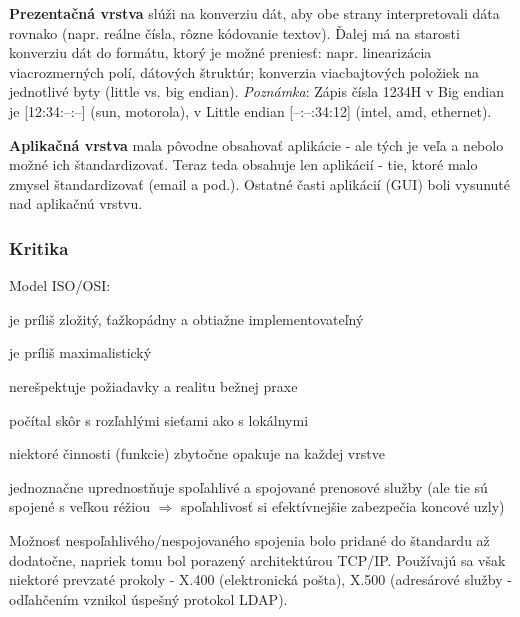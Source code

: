 \textbf{Prezentačná vrstva} slúži na konverziu dát, aby obe strany interpretovali dáta rovnako (napr. reálne čísla, rôzne kódovanie textov). Ďalej má na starosti konverziu dát do formátu, ktorý je možné preniesť: napr. linearizácia viacrozmerných polí, dátových štruktúr; konverzia viacbajtových položiek na jednotlivé byty (little vs. big endian). \emph{Poznámka}: Zápis čísla 1234H v Big endian je [12:34:--:--] (sun, motorola), v Little endian [--:--:34:12] (intel, amd, ethernet).

\textbf{Aplikačná vrstva} mala pôvodne obsahovať aplikácie - ale tých je veľa a nebolo možné ich štandardizovať. Teraz teda obsahuje len  aplikácií - tie, ktoré malo zmysel štandardizovať (email a pod.). Ostatné časti aplikácií (GUI) boli vysunuté nad aplikačnú vrstvu.

\subsubsection*{Kritika}
Model ISO/OSI:
\begin{pitemize}
	\item je príliš zložitý, ťažkopádny a obtiažne implementovateľný
	\item je príliš maximalistický
	\item nerešpektuje požiadavky a realitu bežnej praxe
	\item počítal skôr s rozľahlými sieťami ako s lokálnymi
	\item niektoré činnosti (funkcie) zbytočne opakuje na každej vrstve
	\item jednoznačne uprednostňuje spoľahlivé a spojované prenosové služby (ale tie sú spojené s veľkou réžiou $\Rightarrow$ spoľahlivosť si efektívnejšie zabezpečia koncové uzly)
\end{pitemize}

Možnosť nespoľahlivého/nespojovaného spojenia bolo pridané do štandardu až dodatočne, napriek tomu bol porazený architektúrou TCP/IP. Používajú sa však niektoré prevzaté prokoly - X.400 (elektronická pošta), X.500 (adresárové služby - odľahčením vznikol úspešný protokol LDAP).
